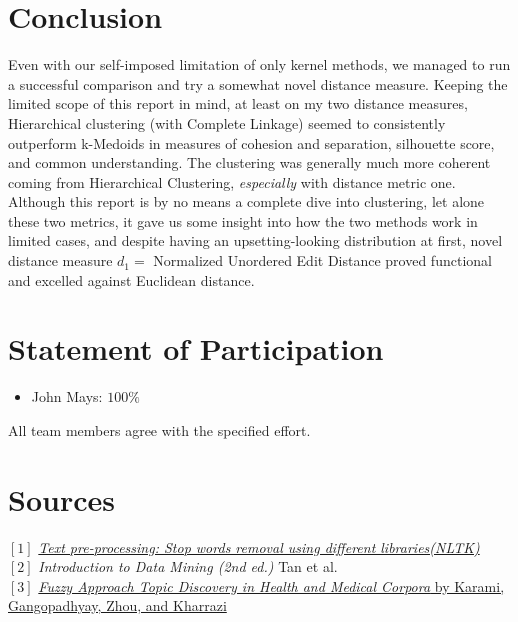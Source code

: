 \documentclass[fleqn]{article}
\begin{document}
\section{Conclusion}
Even with our self-imposed limitation of only kernel methods, we managed to run a successful comparison and try a somewhat novel distance measure.  Keeping the limited scope of this report in mind, at least on my two distance measures, Hierarchical clustering (with Complete Linkage) seemed to consistently outperform k-Medoids in measures of cohesion and separation, silhouette score, and common understanding.  The clustering was generally much more coherent coming from Hierarchical Clustering, \textit{especially} with distance metric one.  Although this report is by no means a complete dive into clustering, let alone these two metrics, it gave us some insight into how the two methods work in limited cases, and despite having an upsetting-looking distribution at first, novel distance measure $d_1=$ Normalized Unordered Edit Distance proved functional and excelled against Euclidean distance.


\section*{Statement of Participation}
\begin{itemize}
	\item John Mays: $100\%$
\end{itemize}
All team members agree with the specified effort.

\section*{Sources}
$[1]$ \href{https://towardsdatascience.com/text-pre-processing-stop-words-removal-using-different-libraries-f20bac19929a}{\textit{Text pre-processing: Stop words removal using different libraries(NLTK)}}\\
$[2]$ \textit{Introduction to Data Mining (2nd ed.)} Tan et al.\\
$[3]$ \href{https://arxiv.org/abs/1705.00995}{\textit{Fuzzy Approach Topic Discovery in Health and Medical Corpora} by Karami, Gangopadhyay, Zhou, and Kharrazi}
\pagebreak
\end{document}
